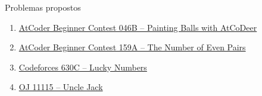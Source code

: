 \begin{frame}[fragile]{Problemas propostos}

    \begin{enumerate}
        \item \href{https://atcoder.jp/contests/abc046/tasks/abc046_b}{AtCoder Beginner Contest 
            046B -- Painting Balls with AtCoDeer}

        \item \href{https://atcoder.jp/contests/abc159/tasks/abc159_a}{AtCoder Beginner Contest
            159A -- The Number of Even Pairs}

        \item \href{https://codeforces.com/problemset/problem/630/C}{Codeforces 630C -- Lucky Numbers}
        \item \href{https://onlinejudge.org/index.php?option=com_onlinejudge&Itemid=8&category=24&page=show_problem&problem=2056}{OJ 11115 -- Uncle Jack}
    \end{enumerate}

\end{frame}
